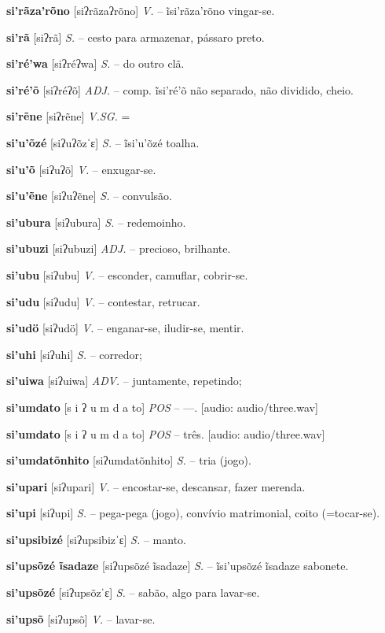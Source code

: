 \textbf{si'rãza'rõno} [siʔrãzaʔrõno] \textit{V.} -- ĩsi'rãza'rõno vingar-se.

\textbf{si'rã} [siʔrã] \textit{S.} -- cesto para armazenar, pássaro preto.

\textbf{si'ré'wa} [siʔréʔwa] \textit{S.} -- do outro clã.

\textbf{si'ré'õ} [siʔréʔõ] \textit{ADJ.} -- comp. ĩsi'ré'õ não separado, não dividido, cheio.

\textbf{si'rẽne} [siʔrẽne] \textit{V.SG.} =

\textbf{si'u'õzé} [siʔuʔõzˈɛ] \textit{S.} -- ĩsi'u'õzé toalha.

\textbf{si'u'õ} [siʔuʔõ] \textit{V.} -- enxugar-se.

\textbf{si'u'ẽne} [siʔuʔẽne] \textit{S.} -- convulsão.

\textbf{si'ubura} [siʔubura] \textit{S.} -- redemoinho.

\textbf{si'ubuzi} [siʔubuzi] \textit{ADJ.} -- precioso, brilhante.

\textbf{si'ubu} [siʔubu] \textit{V.} -- esconder, camuflar, cobrir-se.

\textbf{si'udu} [siʔudu] \textit{V.} -- contestar, retrucar.

\textbf{si'udö} [siʔudö] \textit{V.} -- enganar-se, iludir-se, mentir.

\textbf{si'uhi} [siʔuhi] \textit{S.} -- corredor;

\textbf{si'uiwa} [siʔuiwa] \textit{ADV.} -- juntamente, repetindo;

\textbf{si'umdato} [s i ʔ u m d a to] \textit{POS} -- —. [audio: audio/three.wav]{\faHeadphones}

\textbf{si'umdato} [s i ʔ u m d a to] \textit{POS} -- três. [audio: audio/three.wav]{\faHeadphones}

\textbf{si'umdatõnhito} [siʔumdatõnhito] \textit{S.} -- tria (jogo).

\textbf{si'upari} [siʔupari] \textit{V.} -- encostar-se, descansar, fazer merenda.

\textbf{si'upi} [siʔupi] \textit{S.} -- pega-pega (jogo), convívio matrimonial, coito (=tocar-se).

\textbf{si'upsibizé} [siʔupsibizˈɛ] \textit{S.} -- manto.

\textbf{si'upsõzé ĩsadaze} [siʔupsõzé ĩsadaze] \textit{S.} -- ĩsi'upsõzé ĩsadaze sabonete.

\textbf{si'upsõzé} [siʔupsõzˈɛ] \textit{S.} -- sabão, algo para lavar-se.

\textbf{si'upsõ} [siʔupsõ] \textit{V.} -- lavar-se.

